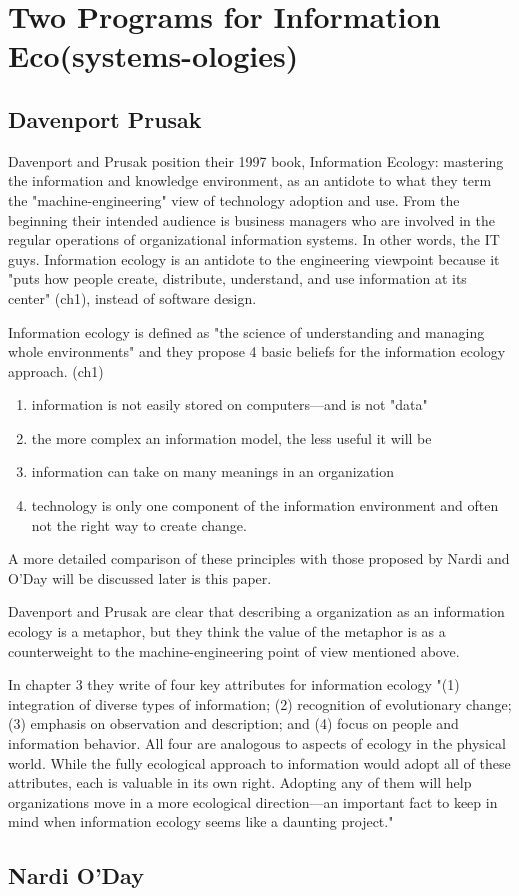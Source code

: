 \section{Two Programs for Information Eco(systems-ologies)}

\subsection{Davenport Prusak}

Davenport and Prusak position their 1997 book, Information Ecology: mastering the information and knowledge environment, as an antidote to what they term the "machine-engineering" view of technology adoption and use. From the beginning their intended audience is business managers who are involved in the regular operations of organizational information systems. In other words, the IT guys. Information ecology is an antidote to the engineering viewpoint because it "puts how people create, distribute, understand, and use information at its center" (ch1), instead of software design.

Information ecology is defined as "the science of understanding and managing whole environments" and they propose 4 basic beliefs for the information ecology approach. (ch1)
\begin{enumerate}
\item information is not easily stored on computers—and is not "data"
\item the more complex an information model, the less useful it will be
\item information can take on many meanings in an organization
\item technology is only one component of the information environment and often not the right way to create change.
\end{enumerate}

A more detailed comparison of these principles with those proposed by Nardi and O'Day will be discussed later is this paper.

Davenport and Prusak are clear that describing a organization as an information ecology is a metaphor, but they think the value of the metaphor is as a counterweight to the machine-engineering point of view mentioned above.

In chapter 3 they write of four key attributes for information ecology
"(1) integration of diverse types of information; (2) recognition of evolutionary change; (3) emphasis on observation and description; and (4) focus on people and information behavior. All four are analogous to aspects of ecology in the physical world. While the fully ecological approach to information would adopt all of these attributes, each is valuable in its own right. Adopting any of them will help organizations move in a more ecological direction—an important fact to keep in mind when information ecology seems like a daunting project."



\subsection{Nardi O'Day}